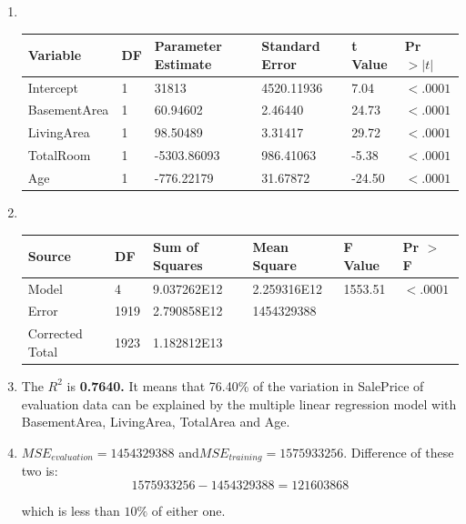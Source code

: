 \documentclass{article}
\begin{document}
\begin{enumerate}[leftmargin = 0 em, label = \arabic*., font = \bfseries]
\item \ 

\begin{center}
\begin{tabular}{*{6}{l}}
\toprule
Variable&DF&Parameter Estimate&Standard Error&t Value&Pr $> |t|$\\
\midrule
Intercept&1&31813&4520.11936&7.04&$<.0001$\\
BasementArea&1&60.94602&2.46440&24.73&$<.0001$\\
LivingArea&1&98.50489&3.31417&29.72&$<.0001$\\
TotalRoom&1&-5303.86093&986.41063&-5.38&$<.0001$\\
Age&1&-776.22179&31.67872&-24.50&$<.0001$\\
\bottomrule
\end{tabular}
\end{center}


\item \ 

\begin{center}
\begin{tabular}{*{6}{l}}
\toprule
Source&DF&Sum of Squares&Mean Square&F Value&Pr $>$ F\\
\midrule
Model&4&9.037262E12&2.259316E12&1553.51&$<.0001$\\
Error&1919&2.790858E12&1454329388&&\\
Corrected Total&1923&1.182812E13&&	\\	
\bottomrule	
\end{tabular}
\end{center}


\item 
The $R^2$ is \textbf{0.7640.}
It means that 76.40\% of the variation in SalePrice of evaluation data can be explained by the multiple linear regression model with BasementArea, LivingArea, TotalArea and Age.


\item 
$MSE_{evaluation} = 1454329388$ and$ MSE_{training} = 1575933256$. Difference of these two is:
\[ 1575933256 - 1454329388 = 121603868 \]

which is less than $10\%$ of either one.

	


\end{enumerate}

	
\end{document}

